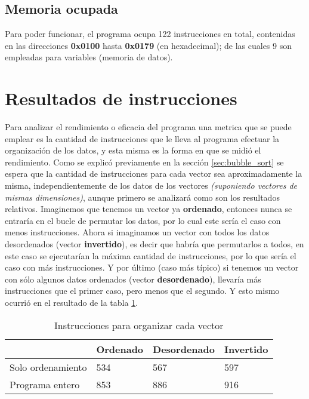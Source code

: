 \documentclass[letterpaper, 10 pt, conference]{ieeeconf}  %
\begin{document}
\subsection{Memoria ocupada}
Para poder funcionar, el programa ocupa 122 instrucciones en total, contenidas en las direcciones \textbf{0x0100} hasta \textbf{0x0179} (en hexadecimal); de las cuales 9 son empleadas para variables (memoria de datos).

\section{Resultados de instrucciones}
Para analizar el rendimiento o eficacia del programa una metrica que se puede emplear es la cantidad de instrucciones que le lleva al programa efectuar la organización de los datos, y esta misma es la forma en que se midió el rendimiento. Como se explicó previamente en la sección \ref{sec:bubble_sort} se espera que la cantidad de instrucciones para cada vector sea aproximadamente la misma, independientemente de los datos de los vectores \textit{(suponiendo vectores de mismas dimensiones)}, aunque primero se analizará como son los resultados relativos. Imaginemos que tenemos un vector ya \textbf{ordenado}, entonces nunca se entraría en el bucle de permutar los datos, por lo cual este sería el caso con menos instrucciones. Ahora si imaginamos un vector con todos los datos desordenados (vector \textbf{invertido}), es decir que habría que permutarlos a todos, en este caso se ejecutarían la máxima cantidad de instrucciones, por lo que sería el caso con más instrucciones. Y por último (caso más típico) si tenemos un vector con sólo algunos datos ordenados (vector \textbf{desordenado}), llevaría más instrucciones que el primer caso, pero menos que el segundo. Y esto mismo ocurrió en el resultado de la tabla \ref{tab:instrucciones}.

\begin{table}[H]
  \centering
  \begin{tabular}{|l|l|l|l|}
    \hline
                  & Ordenado & Desordenado & Invertido \\ \hline
    Solo ordenamiento & 534      & 567         & 597       \\ \hline
    Programa entero   & 853      & 886         & 916       \\ \hline
  \end{tabular}
  \caption{Instrucciones para organizar cada vector}
  \label{tab:instrucciones}
\end{table}
\end{document}
